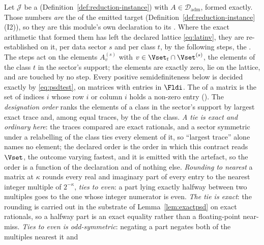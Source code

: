 \begin{definition}
\label{def:emitnorm}
Let $\mathcal{J}$ be a 
(Definition~\ref{def:reduction-instance}) with 
$A\in\mathcal{D}_{\mathrm{adm}}$, formed exactly. Those numbers \emph{are} the
 of the emitted target
(Definition~\ref{def:reduction-instance}\,(I2)), so they are this module's own
declaration to its . Where the exact arithmetic that formed
them has left the declared lattice \eqref{eq:latinv}, they
are re-established on it, per data sector $s$ and per class $t$, by the
following steps, the
.
The steps act on the elements $A^{(s)}_v$ with
$v\in\Vset_t\cap\Vset^{(s)}$, the elements of the class $t$ in the sector's
support; the elements  are exactly zero,
lie on the lattice, and are touched by no step. Every positive
semidefiniteness below is decided exactly by \eqref{eq:psdtest}, on matrices
with entries in $\Fldi$. The
 of a matrix is the set of indices $i$ whose row $i$
or column $i$ holds a non-zero entry (). The
\emph{designation order} ranks the elements of a class in the sector's
support by largest exact trace and, among equal traces, by the
 of the class. \emph{A tie is exact and ordinary here}:
the traces compared are exact rationals, and a sector symmetric under a
relabelling of the class ties every element of it, so ``largest trace''
alone names no element; the declared order is the order in which this
contract reads $\Vset$, the outcome varying fastest, and it is emitted with
the artefact, so the order is a function of the declaration and of nothing
else. \emph{Rounding to nearest} a matrix at $\kappa$ rounds every real and
imaginary part of every entry to the nearest integer multiple of
$2^{-\kappa}$, \emph{ties to even}: a part lying exactly halfway between two
multiples goes to the one whose integer numerator is even. \emph{The tie is
exact}: the rounding is carried out in the substrate of
Lemma~\ref{lem:exactpsd} on exact rationals, so a halfway part is an exact
equality rather than a floating-point near-miss. \emph{Ties to even is
odd-symmetric}: negating a part negates both of the multiples nearest it and

\end{definition}
